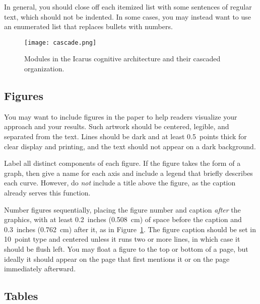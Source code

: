 \documentclass[11pt,letterpaper]{article}
\begin{document}
\vskip 0.05in
\noindent
In general, you should close off each itemized list with some sentences 
of regular text, which should not be indented. In some cases, you may
instead want to use an enumerated list that replaces bullets with numbers. 

\begin{figure}[t]
\vskip 0.05in
\begin{center}
\texttt{[image: cascade.png]}
\caption{Modules in the {\sc Icarus} cognitive architecture and their
         cascaded organization.} 
\label{sample-figure}
\end{center}
\vskip -0.2in
\end{figure} 

\subsection{Figures}
 
You may want to include figures in the paper to help readers visualize
your approach and your results. Such artwork should be centered,
legible, and separated from the text. Lines should be dark and at
least 0.5~points thick for clear display and printing, and the text 
should not appear on a dark background.



Label all distinct components of each figure. If the figure takes
the form of a graph, then give a name for each axis and include a 
legend that briefly describes each curve. However, do {\it not\/} 
include a title above the figure, as the caption already serves
this function. 

Number figures sequentially, placing the figure number and caption
{\it after\/} the graphics, with at least 0.2~inches (0.508~cm) of 
space before the caption and 0.3~inches (0.762~cm) after it, as in
Figure~\ref{sample-figure}. The figure caption should be set in
10~point type and centered unless it runs two or more lines, in which
case it should be flush left. You may float a figure to the top or
bottom of a page, but ideally it should appear on the page that
first mentions it or on the page immediately afterward. 
 
\subsection{Tables} 
 
\end{document}
